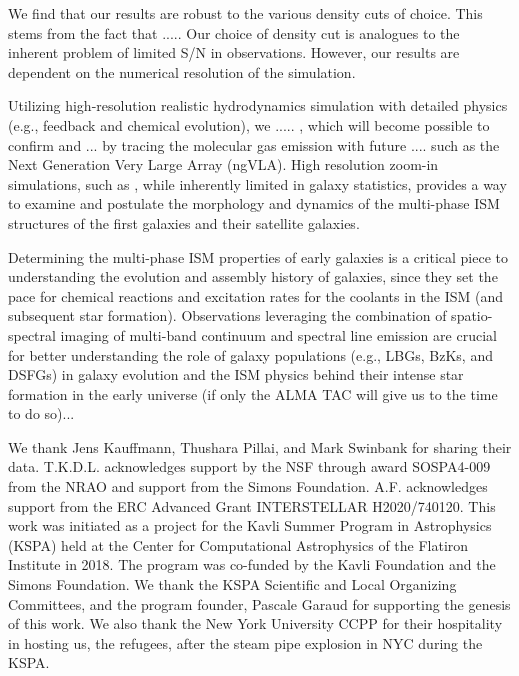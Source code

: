 \documentclass[iop]{emulateapj} %
\begin{document}
We find that our results are robust to the various density cuts of choice.
This stems from the
fact that ..... Our choice of density cut is analogues to the inherent problem of limited S/N
in observations.
However, our results are dependent on the numerical resolution of the simulation.

Utilizing high-resolution realistic hydrodynamics simulation with
detailed physics (e.g., feedback and chemical evolution), we
..... , which will become possible to confirm and ... by tracing
the molecular gas emission with future .... such as the Next Generation Very Large Array (ngVLA).
High resolution zoom-in simulations, such as , while inherently limited in galaxy
statistics, provides a way to examine and postulate the morphology and dynamics of
the multi-phase ISM structures of the first galaxies and their satellite galaxies.

Determining the multi-phase ISM properties of early galaxies
is a critical piece to understanding the evolution and
assembly history of galaxies, since they set the pace
for chemical reactions and excitation rates for the coolants in the ISM (and subsequent star formation).
Observations leveraging the combination of spatio-spectral imaging of
multi-band continuum and spectral line emission are crucial for better understanding
the role of \highz galaxy populations
(e.g., LBGs, BzKs, and DSFGs) in
galaxy evolution and the ISM physics behind their intense star formation in the early universe
(if only the ALMA TAC will give us to the time to do so)...


\acknowledgements

We thank Jens Kauffmann, Thushara Pillai, and Mark Swinbank for sharing their data.
T.K.D.L. acknowledges support by the NSF through award SOSPA4-009
from the NRAO and support from the Simons Foundation.
A.F. acknowledges support from the ERC Advanced Grant INTERSTELLAR H2020/740120.
This work was initiated as a project for the Kavli Summer Program in Astrophysics (KSPA)
held at the Center for
Computational Astrophysics of the Flatiron Institute in 2018. The program was co-funded by the Kavli
Foundation and the Simons Foundation.
We thank the KSPA Scientific and Local Organizing Committees, and the program founder,
Pascale Garaud for supporting the genesis of this work.
We also thank the New York University CCPP for their hospitality in hosting us, the refugees, after the steam pipe explosion in NYC during the KSPA.
\end{document}
